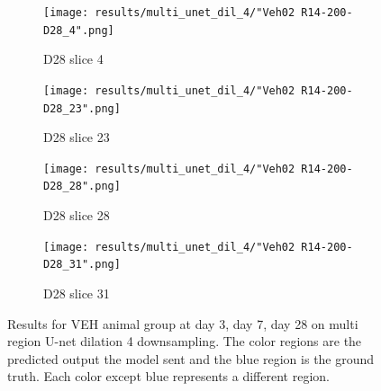 \begin{figure}[!htb]
\medskip
\begin{subfigure}{0.25\textwidth}
  \texttt{[image: results/multi\_unet\_dil\_4/"Veh02 R14-200-D28\_4".png]}
  \caption{D28 slice 4}
\end{subfigure}\hfil %
\begin{subfigure}{0.25\textwidth}
  \texttt{[image: results/multi\_unet\_dil\_4/"Veh02 R14-200-D28\_23".png]}
  \caption{D28 slice 23}
\end{subfigure}\hfil %
\begin{subfigure}{0.25\textwidth}
  \texttt{[image: results/multi\_unet\_dil\_4/"Veh02 R14-200-D28\_28".png]}
  \caption{D28 slice 28}
\end{subfigure}\hfil %
\begin{subfigure}{0.25\textwidth}
  \texttt{[image: results/multi\_unet\_dil\_4/"Veh02 R14-200-D28\_31".png]}
  \caption{D28 slice 31}
\end{subfigure}
  
  \caption{Results for VEH animal group at day 3, day 7, day 28 on multi region U-net dilation 4 downsampling. The color regions are the predicted output the model sent and the blue region is the ground truth. Each color except blue represents a different region.}
  \label{fig:results_multi_unetdil4_VEH}
\end{figure}
